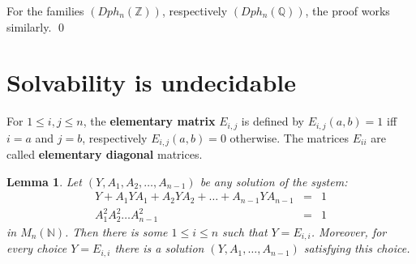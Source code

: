 \documentclass{article}
\theoremstyle{plain}
\newtheorem{lemma}{Lemma}[section]
\theoremstyle{definition}
\begin{document}
For the  families  $\left (Dph_n(\mathbb Z)\right )$, respectively $\left (Dph_n( \mathbb Q) \right )$, the proof works similarly.  \qed




\section{Solvability is undecidable}\label{sect:undec}

 For $1 \leq i, j \leq n$, the {\bf elementary matrix} $E_{i,j}$ is defined by $E_{i,j}(a,b) = 1$ iff $i = a$ and $j = b$, respectively $E_{i,j}(a,b) = 0$ otherwise. The matrices $E_{ii}$ are called {\bf elementary diagonal} matrices. 

\begin{lemma}\label{lemmadefinitionelementarydiagonal}
Let $(Y, A_1, A_2, \dots, A_{n-1})$ be any solution of the system:
   \begin{eqnarray*}
       Y + A_1YA_1 + A_2YA_2 + \dots + A_{n-1} Y A_{n-1} & = & 1 \\
       A_1^2 A_2^2 \dots A_{n-1}^2 & = & 1 
   \end{eqnarray*}
in $M_n(\mathbb N)$. Then there is some $1 \leq i \leq n$ such that $Y = E_{i,i}$. Moreover, for every choice $Y = E_{i,i}$ there is a solution $(Y, A_1, \dots, A_{n-1})$ satisfying this choice.
\end{lemma} 
\end{document}
